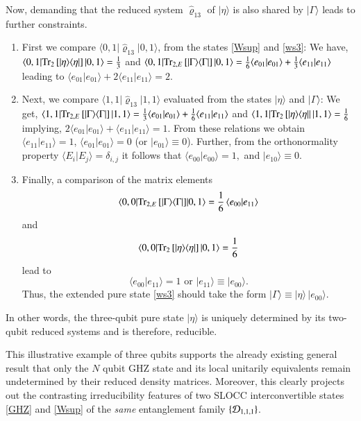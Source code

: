 Now, demanding that the reduced system $\hat{\varrho}_{13}$ of $\vert \eta\rangle$ is also shared by  $\vert \Gamma\rangle$ leads to further constraints.  
\begin{enumerate}
\item First we compare  $\langle 0,1\vert \hat{\varrho}_{13}\vert 0,1\rangle$,  from the states \eqref{Wsup} and \eqref{ws3}: We have, $\langle 0,1|{\rm Tr}_{2}\,[\vert\eta\rangle \langle\eta\vert]\, |0,1\rangle= \frac{1}{3}$ and $\langle 0,1|{\rm Tr}_{2,E}\,[\vert\Gamma\rangle \langle\Gamma\vert]\, |0,1\rangle= \frac{1}{6}\langle e_{01}|e_{01}\rangle+\frac{1}{3}\langle e_{11}|e_{11}\rangle$ leading to $\langle e_{01}|e_{01}\rangle+2\langle e_{11}|e_{11}\rangle=2$. 

\item Next, we compare  $\langle 1,1\vert \hat{\varrho}_{13}\vert 1,1\rangle$ evaluated from the states $\vert\eta\rangle$ and $\vert\Gamma\rangle$: We get, $\langle 1,1|{\rm Tr}_{2, E}\, [|\Gamma\rangle \langle\Gamma|]\,\vert 1,1\rangle=\frac{1}{3}\langle e_{01}|e_{01}\rangle+\frac{1}{6}\langle e_{11}|e_{11}\rangle$ and $\langle 1,1|{\rm Tr}_{2}\, [|\eta\rangle \langle\eta|\vert\, |1,1\rangle=\frac{1}{6}$ implying, $2\langle e_{01}|e_{01}\rangle+\langle e_{11}|e_{11}\rangle=1$. From these relations we obtain $\langle e_{11}|e_{11}\rangle=1$, $\langle e_{01}|e_{01}\rangle=0$ (or $\vert e_{01}\rangle\equiv 0$). Further, from the orthonormality property $\langle E_i\vert E_j\rangle=\delta_{i,j}$ it follows that $\langle e_{00}\vert e_{00}\rangle=1,$ and $\vert e_{10}\rangle\equiv 0$. 

\item Finally, a comparison of the matrix elements 
$$\langle 0,0|{\rm Tr}_{2,E}\,[\vert\Gamma\rangle \langle\Gamma\vert]\break |0,1\rangle= \frac{1}{6}\, \langle e_{00}|e_{11}\rangle$$ and  
$$\langle 0,0|{\rm Tr}_{2}\,[\vert\eta\rangle \langle\eta\vert]\, |0,1\rangle= \frac{1}{6}$$ 
lead to 
$$\langle e_{00}|e_{11}\rangle=1 \mbox{ or } \vert e_{11}\rangle\equiv \vert e_{00}\rangle.$$ 
Thus,  the extended pure state \eqref{ws3} should take the form $\vert \Gamma\rangle\equiv \vert \eta\rangle \, \vert e_{00}\rangle$. 
\end{enumerate}
In other words,  the three-qubit pure state $\vert \eta\rangle$  is uniquely determined by its two-qubit reduced systems and is therefore, reducible. 

This illustrative example of three qubits supports the already existing general result \cite{Walck,Walck2} that only the $N$ qubit GHZ state and its local unitarily equivalents remain undetermined by their reduced density matrices. Moreover, this clearly projects out the contrasting  irreducibility features of two SLOCC interconvertible states \eqref{GHZ} and \eqref{Wsup} of the {\em same} entanglement family $\{{\cal D}_{1,1,1}\}$.   


